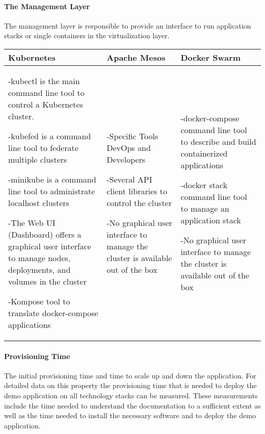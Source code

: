 \newpage
\paragraph{The Management Layer}

The management layer is responsible to provide an interface to run application
stacks or single containers in the virtualization layer.

\begin{center}
  \begin{tabular}{ | p{4.5cm} | p{4.5cm} | p{4.5cm} | }
  	\hline
    \textbf{Kubernetes}&\textbf{Apache Mesos}&\textbf{Docker Swarm}\\\hline
    -kubectl is the main command line tool to control a Kubernetes cluster.
    
    -kubefed is a command line tool to federate multiple clusters

	-minikube is a command line tool to administrate localhost clusters
    
    -The Web UI (Dashboard) offers a graphical user interface to manage nodes,
    deployments, and volumes in the cluster 
    
    -Kompose tool to translate docker-compose applications&
    
    -Specific Tools DevOps and Developers
    
    -Several API client libraries to control the cluster 
    
    -No graphical user interface to manage the cluster is available out of the
    box&
    
    -docker-compose command line tool to describe and build containerized
    applications
    
    -docker stack command line tool to manage an application stack 
    
    -No graphical user interface to manage the cluster is available out of the
    box\\
    
    \hline
  \end{tabular}
\end{center}

\paragraph{Provisioning Time}

The initial provisioning time and time to scale up and down the application.
For detailed data on this property the provisioning time that is needed to
deploy the demo application on all technology stacks can be measured.
These measurements include the time needed to understand the documentation to a
sufficient extent as well as the time needed to install the necessary software
and to deploy the demo application.


